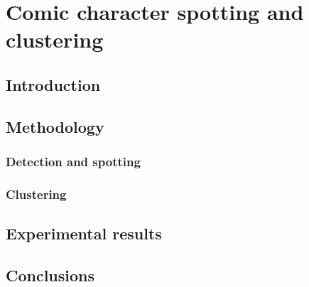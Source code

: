 \chapter{Comic character spotting and clustering}
\label{chap:comic-character-spotting}
\graphicspath{{./chapters/1-introduction/figs/}}

\section{Introduction}


\section{Methodology}


\subsection{Detection and spotting} %
\label{sub:detection_and_spotting}


\subsection{Clustering} %
\label{sub:clustering}



\section{Experimental results}


\section{Conclusions}
